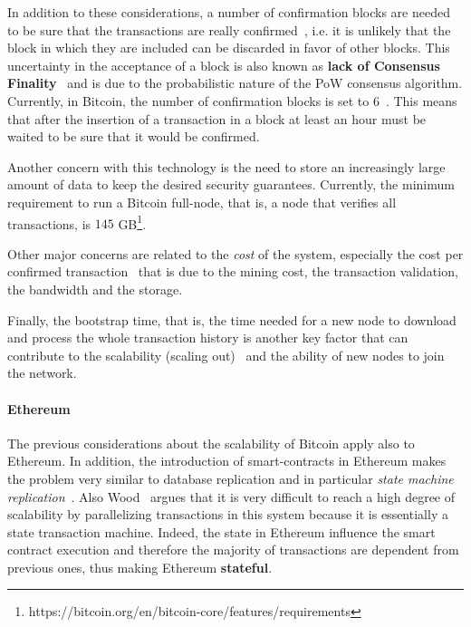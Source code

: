 In addition to these considerations, a number of confirmation blocks are needed
to be sure that the transactions are really confirmed~\cite{bib:taxonomy}, i.e.
it is unlikely that the block in which they are included can be discarded in
favor of other blocks. This uncertainty in the acceptance of a block is also
known as \textbf{lack of Consensus Finality}~\cite{bib:the-quest} and is due to
the probabilistic nature of the PoW consensus algorithm. Currently, in Bitcoin,
the number of confirmation blocks is set to $6$~\cite{bib:masteringbitcoin}.
This means that after the insertion of a transaction in a block at least an hour
must be waited to be sure that it would be confirmed.

Another concern with this technology is the need to store an
increasingly large amount of data to keep the desired security guarantees.
Currently, the minimum requirement to run a Bitcoin full-node, that is, a node
that verifies all transactions, is $145$
GB\footnote{https://bitcoin.org/en/bitcoin-core/features/requirements}.

Other major concerns are related to the \emph{cost} of the system, especially
the cost per confirmed transaction~\cite{bib:scaling-croman} that is due to the
mining cost, the transaction validation, the bandwidth and the storage.

Finally, the bootstrap time, that is, the time needed for a new node to download
and process the whole transaction history is another key factor that can
contribute to the scalability (scaling out)~\cite{bib:scaling-croman} and the
ability of new nodes to join the network.

\paragraph{Ethereum} The previous considerations about the scalability of
Bitcoin apply also to Ethereum. In addition, the introduction of
smart-contracts in Ethereum makes the problem very similar to database
replication and in particular \emph{state machine
replication}~\cite{bib:the-quest}. Also Wood~\cite{wood2018ethereum} argues
that  it is very difficult to reach a high degree of scalability by
parallelizing transactions in this system because it is essentially a state
transaction machine. Indeed, the state in Ethereum influence the smart contract
execution and therefore the majority of transactions are dependent from
previous ones, thus making Ethereum \textbf{stateful}.




